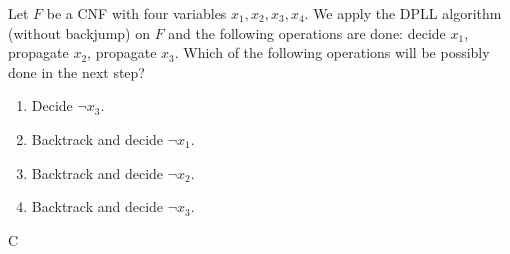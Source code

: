 \documentclass[11pt,a4paper]{article}
\begin{document}
\subproblem Let $F$ be a CNF with four variables $x_1, x_2, x_3, x_4$.
We apply the DPLL algorithm (without backjump) on $F$ and the following operations are done:
decide $x_1$, propagate $x_2$, propagate $x_3$.
Which of the following operations will be possibly done in the next step?

\begin{enumerate}[label=(\Alph*)]
    \item Decide $\lnot x_3$.
    \item Backtrack and decide $\lnot x_1$.
    \item Backtrack and decide $\lnot x_2$.
    \item Backtrack and decide $\lnot x_3$.
\end{enumerate}

\begin{solution}
   C
\end{solution}

\newpage
{}
\end{document}
